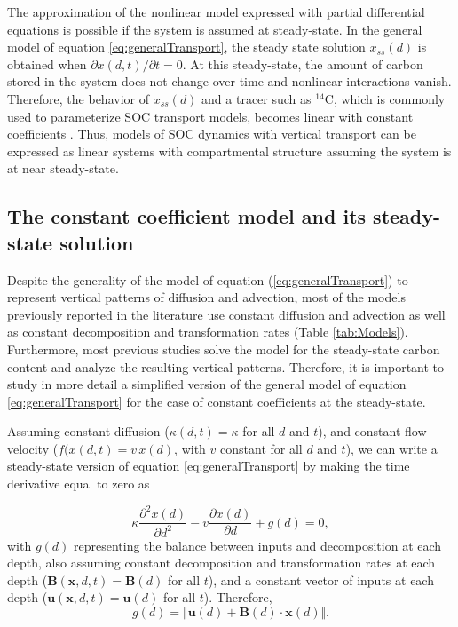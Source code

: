 \documentclass[11pt, oneside, a4paper]{article}   	%
\begin{document}
The approximation of the nonlinear model expressed with partial differential equations is possible if the system is assumed at steady-state. In the general model of equation \ref{eq:generalTransport}, the steady state solution $x_{ss}(d)$ is obtained when $\partial x(d, t)/\partial t =0 $. At this steady-state, the amount of carbon stored in the system does not change over time and nonlinear interactions vanish. Therefore, the behavior of $x_{ss}(d)$ and a tracer such as $^{14}$C, which is commonly used to parameterize SOC transport models, becomes linear with constant coefficients \citep{Anderson1983}. 
Thus, models of SOC dynamics with vertical transport can be expressed as linear systems with compartmental structure assuming the system is at near steady-state. 

\subsection{The constant coefficient model and its steady-state solution}
Despite the generality of the model of equation (\ref{eq:generalTransport}) to represent vertical patterns of diffusion and advection, most of the models previously reported in the literature use constant diffusion and advection as well as  constant decomposition and transformation rates (Table \ref{tab:Models}). Furthermore, most previous studies solve the model for the steady-state carbon content and analyze the resulting vertical patterns. Therefore, it is important to study in more detail a simplified version of the general model of equation \ref{eq:generalTransport} for the case of constant coefficients at the steady-state.

Assuming constant diffusion ($\kappa (d, t) = \kappa$ for all $d$ and $t$), and constant flow velocity ($f(x(d,t) = v \, x(d)$, with $v$ constant for all $d$ and $t$), we can write a steady-state version of equation \ref{eq:generalTransport} by making the time derivative equal to zero as

\begin{equation} \label{eq:linearSecondOrder}
 \kappa \frac{\partial^2 x(d)}{\partial d^2} - v \frac{\partial x(d)}{\partial d} + g(d) =0,
\end{equation}
with $g(d)$ representing the balance between inputs and decomposition at each depth, also assuming constant decomposition and transformation rates at each depth ($\mathbf{B}(\bm{x}, d,t) = \mathbf{B}(d)$ for all  $t$), and a constant vector of inputs at each depth ($\bm{u}(\bm{x}, d, t) = \bm{u}(d)$ for all $t$). Therefore, 
\begin{equation}
g(d) = \Vert \bm{u}(d) + \mathbf{B}(d) \cdot \bm{x}(d) \Vert .
\end{equation}
\end{document}

